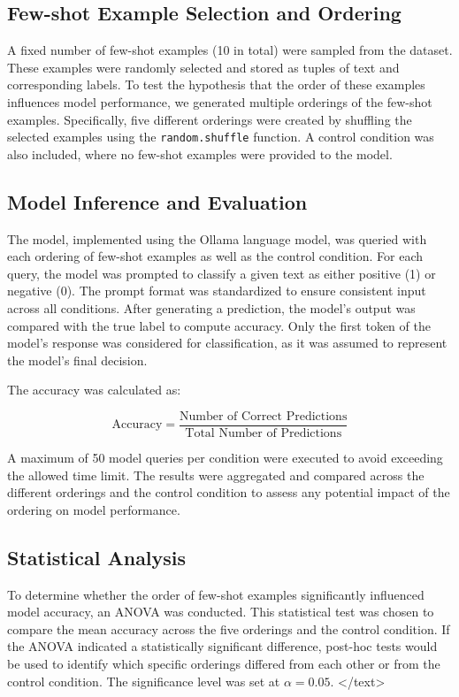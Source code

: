 \documentclass{article}
\begin{document}
\subsection{Few-shot Example Selection and Ordering}

A fixed number of few-shot examples (10 in total) were sampled from the dataset. These examples were randomly selected and stored as tuples of text and corresponding labels. To test the hypothesis that the order of these examples influences model performance, we generated multiple orderings of the few-shot examples. Specifically, five different orderings were created by shuffling the selected examples using the \texttt{random.shuffle} function. A control condition was also included, where no few-shot examples were provided to the model.

\subsection{Model Inference and Evaluation}

The model, implemented using the Ollama language model, was queried with each ordering of few-shot examples as well as the control condition. For each query, the model was prompted to classify a given text as either positive (1) or negative (0). The prompt format was standardized to ensure consistent input across all conditions. After generating a prediction, the model's output was compared with the true label to compute accuracy. Only the first token of the model's response was considered for classification, as it was assumed to represent the model's final decision.

The accuracy was calculated as:

$$
\text{Accuracy} = \frac{\text{Number of Correct Predictions}}{\text{Total Number of Predictions}}
$$

A maximum of 50 model queries per condition were executed to avoid exceeding the allowed time limit. The results were aggregated and compared across the different orderings and the control condition to assess any potential impact of the ordering on model performance.

\subsection{Statistical Analysis}

To determine whether the order of few-shot examples significantly influenced model accuracy, an ANOVA was conducted. This statistical test was chosen to compare the mean accuracy across the five orderings and the control condition. If the ANOVA indicated a statistically significant difference, post-hoc tests would be used to identify which specific orderings differed from each other or from the control condition. The significance level was set at $\alpha = 0.05$.
</text>
\end{document}
